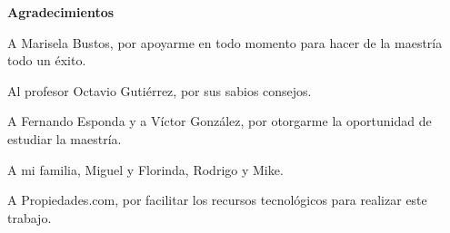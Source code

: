 \begin{center}
{\huge \bfseries Agradecimientos\\}
\end{center}


A Marisela Bustos, por apoyarme en todo momento para hacer de la maestr\'ia todo un \'exito.

Al profesor Octavio Gutiérrez, por sus sabios consejos.

A Fernando Esponda y a V\'ictor Gonz\'alez, por otorgarme la oportunidad de estudiar la maestría.

A mi familia, Miguel y Florinda, Rodrigo y Mike.

A Propiedades.com, por facilitar los recursos tecnol\'ogicos para realizar este trabajo.
